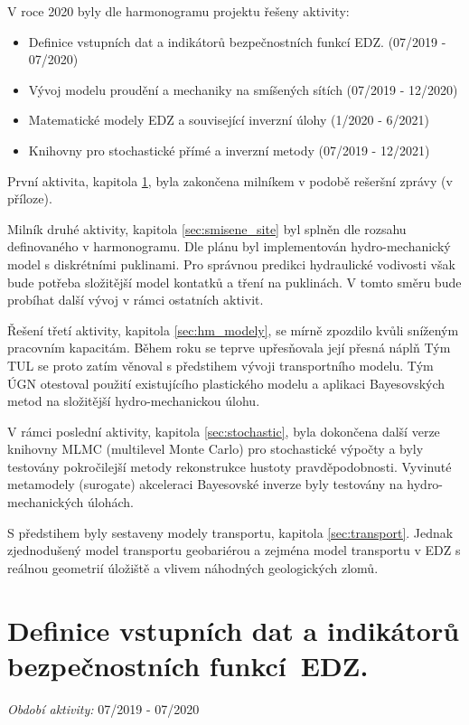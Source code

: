 \documentclass[11pt,a4paper]{article}
\begin{document}
\begin{onehalfspacing}
V roce 2020 byly dle harmonogramu projektu řešeny
aktivity:
\begin{itemize}
\item Definice vstupních dat a indikátorů bezpečnostních funkcí EDZ. (07/2019 - 07/2020)

\item Vývoj modelu proudění a mechaniky na smíšených sítích (07/2019 - 12/2020)

\item Matematické modely EDZ a související inverzní úlohy (1/2020 - 6/2021)

\item Knihovny pro stochastické přímé a inverzní metody (07/2019 - 12/2021)
\end{itemize}

 První aktivita, kapitola \ref{sec:indikatory}, byla zakončena milníkem v podobě rešeršní zprávy (v příloze). 

Milník druhé aktivity, kapitola \ref{sec:smisene_site} byl splněn dle rozsahu definovaného v harmonogramu.
Dle plánu byl implementován hydro-mechanický model s diskrétními puklinami. 
Pro správnou predikci hydraulické vodivosti však bude potřeba složitější model kontatků a tření na puklinách. V tomto směru bude probíhat další vývoj v rámci ostatních aktivit. 

Řešení třetí aktivity, kapitola \ref{sec:hm_modely}, se mírně zpozdilo kvůli sníženým pracovním kapacitám. Během roku se teprve upřesňovala její přesná náplň Tým TUL
se proto zatím věnoval s předstihem vývoji transportního modelu. Tým ÚGN otestoval 
použití existujícího plastického modelu a aplikaci Bayesovských metod na složitější hydro-mechanickou úlohu.

V rámci poslední aktivity, kapitola \ref{sec:stochastic}, byla dokončena další verze knihovny MLMC (multilevel Monte Carlo) pro stochastické výpočty a byly testovány pokročilejší metody rekonstrukce hustoty 
pravděpodobnosti. Vyvinuté metamodely (surogate) akceleraci Bayesovské inverze byly testovány na hydro-mechanických úlohách.

S předstihem byly sestaveny modely transportu, kapitola \ref{sec:transport}. Jednak zjednodušený model transportu geobariérou a zejména model transportu v EDZ s reálnou geometrií úložiště a vlivem náhodných geologických zlomů.
 

\section[Definice indikátorů bezpečnostních funkcí EDZ.]{Definice vstupních dat 
a indikátorů bezpečnostních funkcí~EDZ.}
\label{sec:indikatory}
{\it Období aktivity:}  07/2019 - 07/2020


\end{onehalfspacing}
\end{document}
